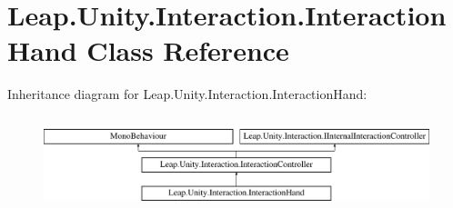 \hypertarget{class_leap_1_1_unity_1_1_interaction_1_1_interaction_hand}{}\section{Leap.\+Unity.\+Interaction.\+Interaction\+Hand Class Reference}
\label{class_leap_1_1_unity_1_1_interaction_1_1_interaction_hand}
Inheritance diagram for Leap.\+Unity.\+Interaction.\+Interaction\+Hand\+:\begin{figure}[H]
\begin{center}
\leavevmode
\includegraphics[height=2.736156cm]{class_leap_1_1_unity_1_1_interaction_1_1_interaction_hand}
\end{center}
\end{figure}
